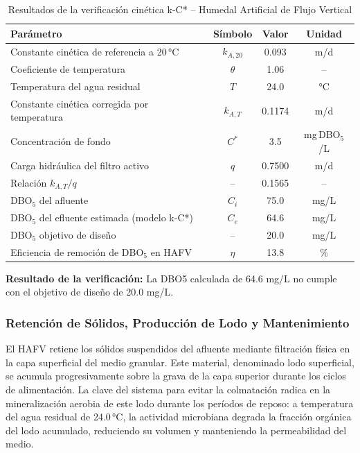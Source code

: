 \documentclass[12pt,a4paper]{article}
\begin{document}
\begin{table}[H]
\centering
\caption{Resultados de la verificación cinética k-C* -- Humedal Artificial de Flujo Vertical}
\label{tab:verificacion_kC}
\begin{tabular}{lccc}
\toprule
\textbf{Parámetro} & \textbf{Símbolo} & \textbf{Valor} & \textbf{Unidad} \\
\midrule
Constante cinética de referencia a 20\,°C & $k_{A,20}$ & 0.093 & m/d \\
Coeficiente de temperatura & $\theta$ & 1.06 & -- \\
Temperatura del agua residual & $T$ & 24.0 & °C \\
Constante cinética corregida por temperatura & $k_{A,T}$ & 0.1174 & m/d \\
Concentración de fondo & $C^*$ & 3.5 & mg\,DBO$_5$/L \\
Carga hidráulica del filtro activo & $q$ & 0.7500 & m/d \\
Relación $k_{A,T} / q$ & -- & 0.1565 & -- \\
DBO$_5$ del afluente & $C_i$ & 75.0 & mg/L \\
DBO$_5$ del efluente estimada (modelo k-C*) & $C_e$ & 64.6 & mg/L \\
DBO$_5$ objetivo de diseño & -- & 20.0 & mg/L \\
Eficiencia de remoción de DBO$_5$ en HAFV & $\eta$ & 13.8 & \% \\
\bottomrule
\end{tabular}
\end{table}

\textbf{Resultado de la verificación:} La DBO5 calculada de 64.6 mg/L no cumple con el objetivo de diseño de 20.0 mg/L.

\subsubsection*{Retención de Sólidos, Producción de Lodo y Mantenimiento}

El HAFV retiene los sólidos suspendidos del afluente mediante filtración física en la capa superficial del medio granular. Este material, denominado lodo superficial, se acumula progresivamente sobre la grava de la capa superior durante los ciclos de alimentación. La clave del sistema para evitar la colmatación radica en la mineralización aerobia de este lodo durante los períodos de reposo: a temperatura del agua residual de 24.0\,°C, la actividad microbiana degrada la fracción orgánica del lodo acumulado, reduciendo su volumen y manteniendo la permeabilidad del medio.
\end{document}
